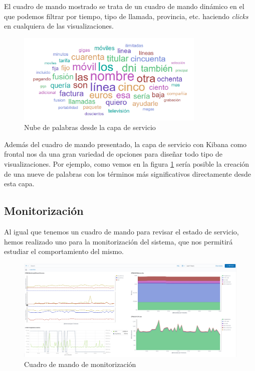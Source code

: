 El cuadro de mando mostrado se trata de un cuadro de mando dinámico en el que podemos filtrar por tiempo, tipo de llamada, provincia, etc. haciendo \textit{clicks} en cualquiera de las visualizaciones. 


\begin{figure}[!ht]
	\centering
	\includegraphics[width=0.8\textwidth]{images/serv/wordcloud}
	\caption{Nube de palabras desde la capa de servicio}
	\label{fig:wordcloud_kib}
\end{figure}


Además del cuadro de mando presentado, la capa de servicio con Kibana como frontal nos da una gran variedad de opciones para diseñar todo tipo de visualizaciones. Por ejemplo, como vemos en la figura \ref{fig:wordcloud_kib} sería posible la creación de una nueve de palabras con los términos más significativos directamente desde  esta capa. 

\subsection{Monitorización}
Al igual que tenemos un cuadro de mando para revisar el estado de servicio, hemos realizado uno para la monitorización del sistema, que nos permitirá estudiar el comportamiento del mismo.

\begin{figure}[!ht]
	\centering
	\includegraphics[width=1\textwidth]{images/serv/CM-monitoring}
	\caption{Cuadro de mando de monitorización}
	\label{fig:cmmon}
\end{figure}

